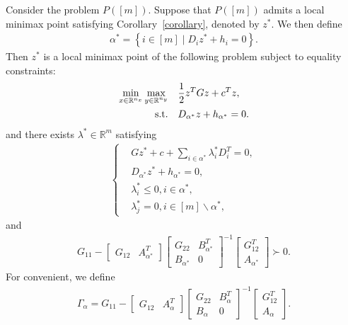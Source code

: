 \documentclass{article}
\begin{document}
	Consider the problem $P([m])$. 
	Suppose that $P([m])$ admits a local minimax point satisfying Corollary~\ref{corollary}, denoted by $z^{\ast}$. 
	We then define
	\begin{align*}
		\alpha^{\ast} = \left\lbrace i\in [m] \mid D_{i}z^{\ast} + h_{i} = 0\right\rbrace.
	\end{align*}
	Then $z^{\ast}$ is a local minimax point of the following problem subject to equality constraints:
	\begin{align}\label{equality}
		\begin{aligned}
			\min_{x\in\mathbb{R}^{n_{x}}}\max_{y\in\mathbb{R}^{n_{y}}}\quad& \frac{1}{2}z^{T}Gz + c^{T}z,\\
			{\rm s.t.}\quad & D_{\alpha^{\ast}}z + h_{\alpha^{\ast}} = 0.
		\end{aligned}
	\end{align}
	and there exists $\lambda^{\ast}\in\mathbb{R}^{m}$ satisfying 
	\begin{align}\label{S-pair1}
		\left\lbrace\begin{aligned}
			& Gz^{\ast} + c + \sum_{i \in \alpha^{\ast}}\lambda_{i}^{\ast}D_{i}^{T} = 0,\\
			& D_{\alpha^{\ast}}z^{\ast} + h_{\alpha^{\ast}} = 0,\\
			& \lambda_{i}^{\ast} \leq 0, i \in \alpha^{\ast},\\
			& \lambda_{j}^{\ast} = 0, i \in [m]\backslash\alpha^{\ast},
		\end{aligned}\right.
	\end{align}
	and
	\begin{align}\label{S-pair2}
		G_{11} - \begin{bmatrix}
			G_{12} & A_{\alpha^{\ast}}^{T}
		\end{bmatrix} \begin{bmatrix}
		G_{22} & B_{\alpha^{\ast}}^{T}\\
		B_{\alpha^{\ast}} & 0
		\end{bmatrix}^{-1} \begin{bmatrix}
		G_{12}^{T}\\
		A_{\alpha^{\ast}}
		\end{bmatrix} \succ 0.
	\end{align}
	For convenient, we define
	\begin{align}
		\Gamma_{\alpha} = G_{11} - \begin{bmatrix}
			G_{12} & A_{\alpha}^{T}
		\end{bmatrix} \begin{bmatrix}
			G_{22} & B_{\alpha}^{T}\\
			B_{\alpha} & 0
		\end{bmatrix}^{-1} \begin{bmatrix}
			G_{12}^{T}\\
			A_{\alpha}
		\end{bmatrix}.
	\end{align}
	
\end{document}
